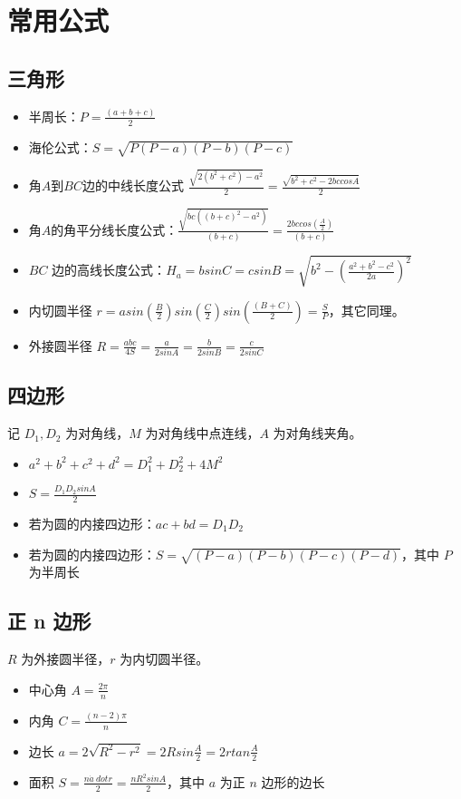 \section{常用公式}
\subsection{三角形}
\begin{itemize}
    \item 半周长：$P=\frac{(a+b+c)}{2}$
    \item 海伦公式：$S=\sqrt{P(P-a)(P-b)(P-c)}$
    \item 角$A$到$BC$边的中线长度公式 $\frac{\sqrt{2(b^2+c^2)-a^2}}{2} = \frac{\sqrt{b^2+c^2-2bccosA}}{2}$
    \item 角$A$的角平分线长度公式：$\frac{\sqrt{bc((b+c)^2-a^2)}}{(b+c)} = \frac{2bccos(\frac{A}{2})}{(b+c)}$
    \item $BC$ 边的高线长度公式：$H_a = bsinC = csinB = \sqrt{b^2-(\frac{a^2+b^2-c^2}{2a})^2}$
    \item 内切圆半径 $r = asin(\frac{B}{2})sin(\frac{C}{2})sin(\frac{(B+C)}{2})=\frac{S}{P}$，其它同理。
    \item 外接圆半径 $R = \frac{abc}{4S} =  \frac{a}{2sinA} = \frac{b}{2sinB} = \frac{c}{2sinC}$
\end{itemize}

\subsection{四边形}
\noindent 记 $D_1, D_2$ 为对角线，$M$ 为对角线中点连线，$A$ 为对角线夹角。
\begin{itemize}
    \item $a^2+b^2+c^2+d^2=D_1^2+D_2^2+4M^2$
    \item $S=\frac{D_1D_2sinA}{2}$
    \item 若为圆的内接四边形：$ac+bd=D_1D_2$
    \item 若为圆的内接四边形：$S=\sqrt{(P-a)(P-b)(P-c)(P-d)}$，其中 $P$ 为半周长
\end{itemize}

\subsection{正 n 边形}
\noindent $R$ 为外接圆半径，$r$ 为内切圆半径。
\begin{itemize}
    \item 中心角 $A = \frac{2\pi}{n}$
    \item 内角 $C=\frac{(n-2)\pi}{n}$
    \item 边长 $a = 2\sqrt{R^2-r^2} = 2Rsin\frac{A}{2} = 2rtan\frac{A}{2}$
    \item 面积 $S = \frac{n \dot a \ dot r}{2}=\frac{nR^2sinA}{2}$，其中 $a$ 为正 $n$ 边形的边长
\end{itemize}

